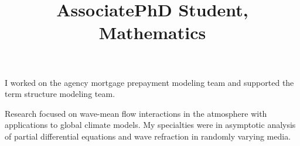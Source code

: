 \begin{resume}
\title{Associate}
\begin{position}
I worked on the agency mortgage prepayment modeling team and supported the term structure modeling team.

\end{position}


\title{PhD Student, Mathematics}
\begin{position}
Research focused on wave-mean flow interactions in the atmosphere with applications to global climate models.
My specialties were in asymptotic analysis of partial differential equations and wave refraction in randomly varying media.
\end{position}




\end{resume}
